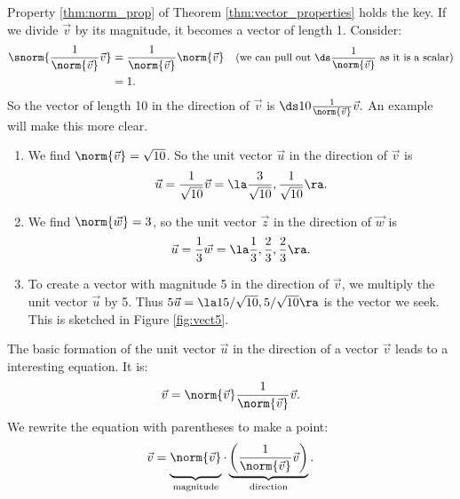 Property \ref{thm:norm_prop} of Theorem \ref{thm:vector_properties} holds the key. If we divide $\vec v$ by its magnitude, it becomes a vector of length 1. Consider:
\begin{align*}
\snorm{\frac{1}{\norm{\vec v}}\vec v} &= \frac{1}{\norm{\vec v}}\norm{\vec v} & \text{\small (we can pull out $\ds \frac{1}{\norm{\vec v}}$ as it is a scalar)}\\
								&= 1.
\end{align*}			
So the vector of length 10 in the direction of $\vec v$ is $\ds 10\frac{1}{\norm{\vec v}}\vec v.$ An example will make this more clear.\\

{\begin{enumerate}
	\item We find $\norm{\vec v} = \sqrt{10}$. So the unit vector $\vec u$ in the direction of $\vec v$ is $$\vec u = \frac{1}{\sqrt{10}}\vec v = \la \frac{3}{\sqrt{10}},\frac{1}{\sqrt{10}}\ra.$$
	\item		We find $\norm{\vec w} = 3$, so the unit vector $\vec z$ in the direction of $\vec w$ is
	$$\vec u = \frac13\vec w = \la \frac13,\frac23,\frac23\ra.$$
	\item		To create a vector with magnitude 5 in the direction of $\vec v$, we multiply the unit vector $\vec u$ by 5. Thus $5\vec u = \la 15/\sqrt{10},5/\sqrt{10}\ra$ is the vector we seek. This is sketched in Figure \ref{fig:vect5}.
\end{enumerate}}

The basic formation of the unit vector $\vec u$ in the direction of a vector $\vec v$ leads to a interesting equation. It is:
$$\vec v = \norm{\vec v}\frac{1}{\norm{\vec v}}\vec v.$$
We rewrite the equation with parentheses to make a point:
$$\vec v = \underbrace{\rule[-9.5pt]{0pt}{15pt}\norm{\vec v}}_{\text{\scriptsize magnitude}}\cdot\underbrace{\left(\frac{1}{\norm{\vec v}}\vec v\right)}_{\text{\scriptsize direction}}.$$

